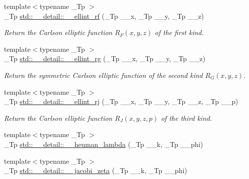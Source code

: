 \begin{DoxyCompactItemize}
{\footnotesize template$<$typename \+\_\+\+Tp $>$ }\\\+\_\+\+Tp \hyperlink{namespacestd_1_1____detail_a2cca271dcbdf22923219eab7a02450d5}{std\+::\+\_\+\+\_\+detail\+::\+\_\+\+\_\+ellint\+\_\+rf} (\+\_\+\+Tp \+\_\+\+\_\+x, \+\_\+\+Tp \+\_\+\+\_\+y, \+\_\+\+Tp \+\_\+\+\_\+z)
\begin{DoxyCompactList}\small\item\em Return the Carlson elliptic function $ R_F(x,y,z) $ of the first kind. \end{DoxyCompactList}\item 
{\footnotesize template$<$typename \+\_\+\+Tp $>$ }\\\+\_\+\+Tp \hyperlink{namespacestd_1_1____detail_aaceff1eb320e0602afee36c60b80f87a}{std\+::\+\_\+\+\_\+detail\+::\+\_\+\+\_\+ellint\+\_\+rg} (\+\_\+\+Tp \+\_\+\+\_\+x, \+\_\+\+Tp \+\_\+\+\_\+y, \+\_\+\+Tp \+\_\+\+\_\+z)
\begin{DoxyCompactList}\small\item\em Return the symmetric Carlson elliptic function of the second kind $ R_G(x,y,z) $. \end{DoxyCompactList}\item 
{\footnotesize template$<$typename \+\_\+\+Tp $>$ }\\\+\_\+\+Tp \hyperlink{namespacestd_1_1____detail_afe05ce66130b5f47389137c3f9aa6949}{std\+::\+\_\+\+\_\+detail\+::\+\_\+\+\_\+ellint\+\_\+rj} (\+\_\+\+Tp \+\_\+\+\_\+x, \+\_\+\+Tp \+\_\+\+\_\+y, \+\_\+\+Tp \+\_\+\+\_\+z, \+\_\+\+Tp \+\_\+\+\_\+p)
\begin{DoxyCompactList}\small\item\em Return the Carlson elliptic function $ R_J(x,y,z,p) $ of the third kind. \end{DoxyCompactList}\item 
{\footnotesize template$<$typename \+\_\+\+Tp $>$ }\\\+\_\+\+Tp \hyperlink{namespacestd_1_1____detail_a90938823a16cabc06031ebf209066a94}{std\+::\+\_\+\+\_\+detail\+::\+\_\+\+\_\+heuman\+\_\+lambda} (\+\_\+\+Tp \+\_\+\+\_\+k, \+\_\+\+Tp \+\_\+\+\_\+phi)
\item 
{\footnotesize template$<$typename \+\_\+\+Tp $>$ }\\\+\_\+\+Tp \hyperlink{namespacestd_1_1____detail_a1d5fc69202703d72974c4370fd7ade03}{std\+::\+\_\+\+\_\+detail\+::\+\_\+\+\_\+jacobi\+\_\+zeta} (\+\_\+\+Tp \+\_\+\+\_\+k, \+\_\+\+Tp \+\_\+\+\_\+phi)
\end{DoxyCompactItemize}


